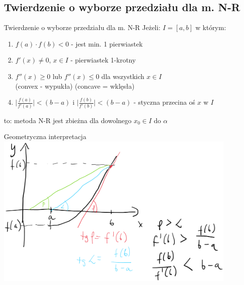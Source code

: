 \subsection{Twierdzenie o wyborze przedziału dla m. N-R}
\begin{frame}{Twierdzenie o wyborze przedziału dla m. N-R}
	Jeżeli: $I = \left[a, b\right]$ w którym:
	\begin{enumerate}
		\item $f(a) \cdot f(b) < 0$ - jest min. 1 pierwiastek
		\item $f'(x) \neq 0$, $x \in I$ - pierwiastek 1-krotny
		\item $f''(x) \geq 0$ lub $f''(x) \leq 0$ dla wszystkich $x \in I$\\
			(convex - wypukła) (concave = wklęsła)
		\item $\lvert \frac{f(a)}{f'(a)} \rvert < (b - a)$ i $\lvert \frac{f(b)}{f'(b)} \rvert < (b - a)$ - styczna przecina oś $x$  w  $I$
	\end{enumerate}
	to:
	metoda N-R jest zbieżna dla dowolnego $x_{0} \in I$ do $\alpha$
\end{frame}
\begin{frame}{Geometryczna interpretacja}
\includegraphics[width=0.9\textwidth]{img/7/nieliniowe1.png}
\end{frame}

